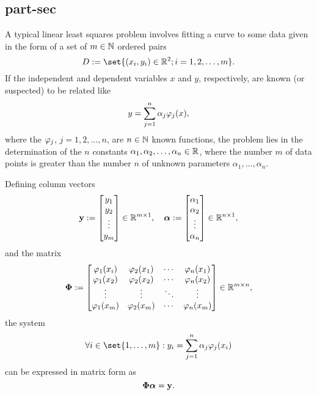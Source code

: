 \subsection{part-sec}
\label{sub:part-sec}
  A typical linear least squares problem involves fitting a curve to some data given in the form of a set of $m \in \mathbb{N}$ ordered pairs
  \begin{equation}
  \label{eqn:ordered_pair_data}
    D := \set{\rbr{x_i, y_i}\in\bbR^2 ; i = 1, 2, \ldots, m}.
  \end{equation}
  If the independent and dependent variables $x$ and $y$, respectively, are known (or suspected) to be related like
  \begin{equation}
  \label{eqn:underlying_functional_relationship}
    y = \sum_{j = 1}^n \alpha_j \varphi_j(x),
  \end{equation}
  where the $\varphi_j$, $j = 1, 2,\ldots, n$, are $n \in \mathbb{N}$ known functions, the problem lies in the determination of the $n$ constants $\alpha_1, \alpha_2, \ldots, \alpha_n \in \mathbb{R}$, where the number $m$ of data points is greater than the number $n$ of unknown parameters $\alpha_1, \ldots, \alpha_n$.
  
  Defining column vectors
  \begin{equation}
  \label{eqn:y_and_alpha_vectors}
    \mathbf{y} := \begin{bmatrix}
             y_1 \\
             y_2 \\
             \vdots \\
             y_m
           \end{bmatrix} \in \mathbb{R}^{m \times 1}, \quad
    \boldsymbol{\alpha} := \begin{bmatrix}
                 \alpha_1 \\
                 \alpha_2 \\
                 \vdots \\
                 \alpha_n
               \end{bmatrix} \in \mathbb{R}^{n \times 1},
  \end{equation}
  and the matrix
  \begin{equation}
  \label{eqn:phi_matrix}
    \boldsymbol{\Phi} := \begin{bmatrix}
               \varphi_1(x_i) & \varphi_2(x_1) & \cdots & \varphi_n(x_1) \\
               \varphi_1(x_2) & \varphi_2(x_2) & \cdots & \varphi_n(x_2) \\
               \vdots     & \vdots     & \ddots & \vdots     \\
               \varphi_1(x_m) & \varphi_2(x_m) & \cdots & \varphi_n(x_m)
             \end{bmatrix} \in \mathbb{R}^{m \times n},
  \end{equation}
  the system
  \begin{equation}
  \label{eqn:data_system_of_equations}
    \forall i \in \set{1,\ldots,m} : y_i = \sum_{j = 1}^n \alpha_j \ph_j(x_i)
  \end{equation}
  can be expressed in matrix form as
  \begin{equation}
  \label{eqn:data_matix_equation}
    \boldsymbol{\Phi} \boldsymbol{\alpha} = \mathbf{y}.
  \end{equation}
  
